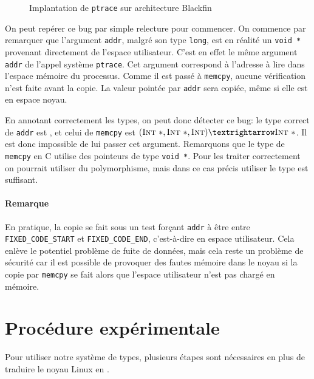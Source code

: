 \begin{figure}
    \caption{Implantation de \texttt{ptrace} sur architecture Blackfin}
    \label{fig:ptrace-blackfin}
\end{figure}

On peut repérer ce bug par simple relecture pour commencer. On commence par
remarquer que l'argument \texttt{addr}, malgré son type \texttt{long}, est en
réalité un \texttt{void *} provenant directement de l'espace utilisateur. C'est
en effet le même argument \texttt{addr} de l'appel système \texttt{ptrace}.
Cet argument correspond à l'adresse à lire dans l'espace mémoire du processus.
Comme il est passé à \texttt{memcpy}, aucune vérification n'est faite avant la
copie. La valeur pointée par \texttt{addr} sera copiée, même si elle est en
espace noyau.

En annotant correctement les types, on peut donc détecter ce bug: le type
correct de \texttt{addr} est \ptrU{\tInt}, et celui de \texttt{memcpy} est
$(\ptrK{\tInt}, \ptrK{\tInt}, \tInt) → \ptrK{\tInt}$. Il est donc impossible de
lui passer cet argument. Remarquons que le type de \texttt{memcpy} en C utilise
des pointeurs de type \texttt{void *}. Pour les traiter correctement on pourrait
utiliser du polymorphisme, mais dans ce cas précis utiliser le type \ptrK{\tInt}
est suffisant.

\paragraph{Remarque}


En pratique, la copie se fait sous un test forçant \texttt{addr} à être entre
\nolinkurl{FIXED\_CODE\_START} et \texttt{FIXED\_CODE\_END}, c'est-à-dire en
espace utilisateur. Cela enlève le potentiel problème de fuite de données, mais
cela reste un problème de sécurité car il est possible de provoquer des fautes
mémoire dans le noyau si la copie par \texttt{memcpy} se fait alors que l'espace
utilisateur n'est pas chargé en mémoire.

\section{Procédure expérimentale}
\label{sec:demo-unif}

Pour utiliser notre système de types, plusieurs étapes sont nécessaires en plus
de traduire le noyau Linux en \langname{}.

